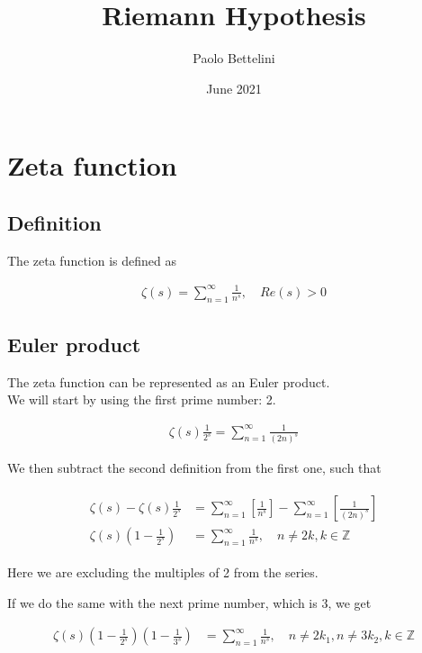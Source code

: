 \documentclass{article}
\title{Riemann Hypothesis}
\author{Paolo Bettelini}
\date{June 2021}
\begin{document}
\maketitle
\tableofcontents
\pagebreak

\section{Zeta function}

\subsection{Definition}

The zeta function is defined as

\begin{align*}
    \zeta(s)=\sum_{n=1}^{\infty}\frac{1}{n^s},\quad Re(s)>0
\end{align*}

\subsection{Euler product}

The zeta function can be represented as an Euler product.
\\
We will start by using the first prime number: 2.

\begin{align*}
    \zeta(s)\frac{1}{2^s}=\sum_{n=1}^{\infty}\frac{1}{(2n)^s}
\end{align*}

We then subtract the second definition from the first one, such that

\begin{align*}
    \begin{split}
        \zeta(s)-\zeta(s)\frac{1}{2^s}&=
        \sum_{n=1}^{\infty}\left[\frac{1}{n^s}\right]-
        \sum_{n=1}^{\infty}\left[\frac{1}{(2n)^s}\right]
        \\
        \zeta(s)\left(1-\frac{1}{2^s}\right)&=
        \sum_{n=1}^{\infty}\frac{1}{n^s},
        \quad n\neq 2k,k\in \mathds{Z}
    \end{split}
\end{align*}

Here we are excluding the multiples of 2 from the series.

If we do the same with the next prime number, which is 3, we get

\begin{align*}
    \zeta(s)\left(1-\frac{1}{2^s}\right)\left(1-\frac{1}{3^s}\right)&=
    \sum_{n=1}^{\infty}\frac{1}{n^s},
    \quad n\neq 2k_1,n\neq 3k_2, k\in \mathds{Z}
\end{align*}
\end{document}
